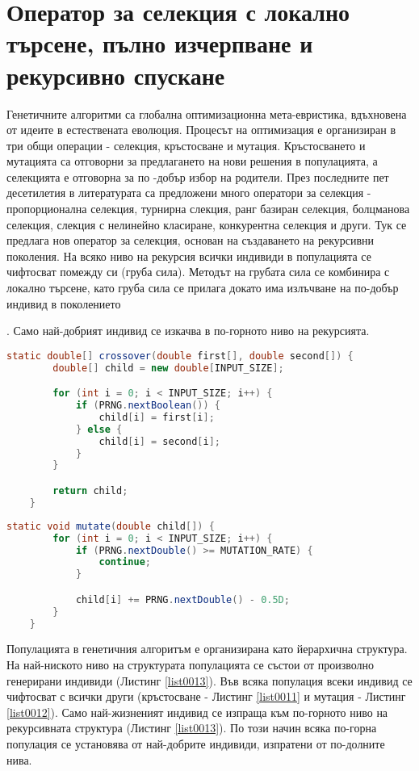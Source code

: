 \section{Оператор за селекция с локално търсене, пълно изчерпване и рекурсивно спускане}

Генетичните алгоритми са глобална оптимизационна мета-евристика, вдъхновена от идеите в естествената еволюция. Процесът на оптимизация е организиран в три общи операции - селекция, кръстосване и мутация. Кръстосването и мутацията са отговорни за предлагането на нови решения в популацията, а селекцията е отговорна за по -добър избор на родители. През последните пет десетилетия в литературата са предложени много оператори за селекция - пропорционална селекция, турнирна слекция, ранг базиран селекция, болцманова селекция, слекция с нелинейно класиране, конкурентна селекция и други. Тук се предлага нов оператор за селекция, основан на създаването на рекурсивни поколения. На всяко ниво на рекурсия всички индивиди в популацията се чифтосват помежду си (груба сила). Методът на грубата сила се комбинира с локално търсене, като груба сила се прилага докато има излъчване на по-добър индивид в поколението\begin{comment}\cite{Balabanov-01}\end{comment}. Само най-добрият индивид се изкачва в по-горното ниво на рекурсията. 

\begin{lstlisting}[caption=Равномерно кръстосване, language=Java, basicstyle=\tiny, label=list0011]
	static double[] crossover(double first[], double second[]) {
		double[] child = new double[INPUT_SIZE];

		for (int i = 0; i < INPUT_SIZE; i++) {
			if (PRNG.nextBoolean()) {
				child[i] = first[i];
			} else {
				child[i] = second[i];
			}
		}

		return child;
	}
\end{lstlisting}

\begin{lstlisting}[caption=Мутация със случайно число, language=Java, basicstyle=\tiny, label=list0012]
	static void mutate(double child[]) {
		for (int i = 0; i < INPUT_SIZE; i++) {
			if (PRNG.nextDouble() >= MUTATION_RATE) {
				continue;
			}

			child[i] += PRNG.nextDouble() - 0.5D;
		}
	}
\end{lstlisting}

Популацията в генетичния алгоритъм е организирана като йерархична структура. На най-ниското ниво на структурата популацията се състои от произволно генерирани индивиди (Листинг \ref{list0013}). Във всяка популация всеки индивид се чифтосват с всички други (кръстосване - Листинг \ref{list0011} и мутация - Листинг \ref{list0012}). Само най-жизненият индивид се изпраща към по-горното ниво на рекурсивната структура (Листинг \ref{list0013}). По този начин всяка по-горна популация се установява от най-добрите индивиди, изпратени от по-долните нива.

